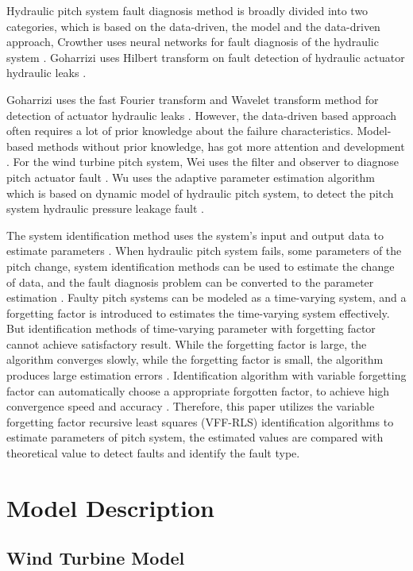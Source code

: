 \documentclass{article}
\begin{document}
Hydraulic pitch system fault diagnosis method is broadly divided into two
categories, which is based on the data-driven, the model and the data-driven
approach, Crowther  uses neural networks for fault diagnosis of
the hydraulic system \cite{ref:4}. Goharrizi uses Hilbert transform on fault detection of hydraulic actuator hydraulic leaks \cite{ref:5}.

Goharrizi uses the fast Fourier transform and Wavelet transform method for detection
of actuator hydraulic leaks \cite{ref:6}. However, the data-driven based approach
 often requires a lot of prior knowledge about the failure characteristics.
Model-based methods without prior knowledge, has got more attention and development
\cite{ref:7}. For the wind turbine pitch system, Wei uses the filter and observer to
diagnose pitch actuator fault \cite{ref:8}. Wu uses the adaptive parameter
estimation algorithm which is based on dynamic model of hydraulic pitch system, to
detect the pitch system hydraulic pressure leakage fault \cite{ref:9}.

The system identification method uses the system's input and output data to estimate
parameters \cite{ref:10}. When hydraulic pitch system fails, some
parameters of the pitch change, system identification methods can be used to estimate the change of data, and the fault diagnosis problem can
be converted to the parameter estimation \cite{ref:11}. Faulty pitch
systems can be modeled as a time-varying system, and a forgetting factor
is introduced to  estimates the time-varying system effectively.
But identification methods of time-varying parameter with forgetting factor cannot achieve
satisfactory result. While the forgetting factor is large, the algorithm converges slowly,
while the forgetting factor is small, the algorithm produces large estimation errors \cite{ref:12}.
Identification algorithm with variable forgetting factor can automatically choose
a appropriate forgotten
factor, to achieve high convergence speed and accuracy \cite{ref:13}. Therefore, this
paper utilizes the variable forgetting factor recursive least squares (VFF-RLS)
identification algorithms to estimate parameters of pitch system, the
estimated values are
compared with theoretical value to detect faults and identify the fault type.


\section{Model Description}


\subsection{Wind Turbine Model}
\end{document}

